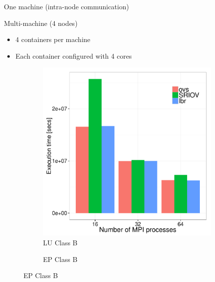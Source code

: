 \documentclass[11pt,xcolor=dvipsnames,presentation]{beamer}
\begin{document}
\begin{frame}[label=sec-4-0-10]{One machine (intra-node communication)}
\begin{figure}
\begin{subfigure}[b]{0.42\textwidth}
  \end{subfigure}
\end{figure}
\end{frame}

\begin{frame}[label=sec-4-0-11]{Multi-machine (4 nodes)}
\begin{itemize}
\item 4 containers per machine
\item Each container configured with 4 cores
\end{itemize}

\begin{figure}
  \centering
  \begin{subfigure}[b]{0.42\textwidth}
    \caption{LU Class B}
    \includegraphics[scale=0.25,angle=0]{figures/inter-container-luB.pdf}
  \end{subfigure}
  \begin{subfigure}[b]{0.42\textwidth}
    \caption{EP Class B}

\end{subfigure}
\end{figure}
\end{frame}
\end{document}
